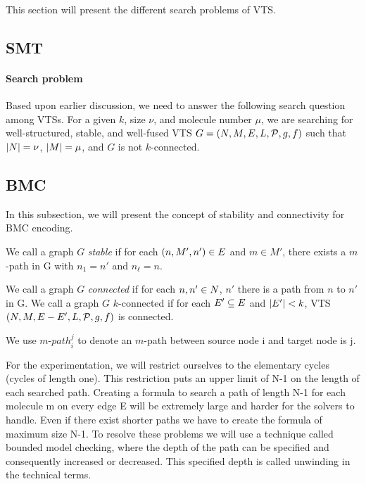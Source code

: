 This section will present the different search problems of VTS.

\subsection{SMT}
\paragraph{Search problem}
Based upon earlier discussion, we need to answer the following search
question among VTSs.
For a given $k$, size $\nu$, and molecule number $\mu$,
we are searching for well-structured, stable, and well-fused VTS
$G = (N,M,E,L,\mathcal{P},g,f)$ such that
$|N| = \nu$, $|M| = \mu$, and
$G$ is not $k$-connected.    

\subsection{BMC}
In this subsection, we will present the concept of stability and connectivity for BMC encoding. 

%
We call a graph $G$ {\em stable} if for each $(n,M',n') \in E$ and $m \in M'$,
there exists a $m$-path in G with $n_1 = n'$ and $n_\ell = n$.
%

%
We call a graph $G$ {\em connected} if for each $n,n' \in N$,
$n'$ there is a path from $n$ to $n'$ in G.
%
We call a graph $G$ $k$-connected if for each $E' \subseteq E$ and $|E'| < k$,
VTS $(N,M,E-E',L,\mathcal{P},g,f)$ is connected.
%

We use $m$-${path}_i^j$ to denote an $m$-path between source node i and target node is j. 

For the experimentation, we will restrict ourselves to the elementary cycles (cycles of length one). 
%
This restriction puts an upper limit of N-1 on the length of each searched path. 
%
Creating a formula to search a path of length N-1 for each molecule m on every edge E will be extremely large and harder for the solvers to handle.  
%
Even if there exist shorter paths we have to create the formula of maximum size N-1. 
% 
To resolve these problems we will use a technique called bounded model checking, where the depth of the path can be specified and consequently increased or decreased.  
%
This specified depth is called unwinding in the technical terms.

